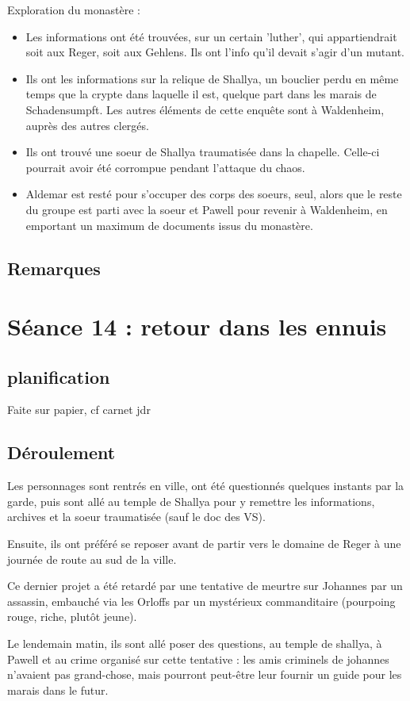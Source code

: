 \documentclass[10pt,a4paper]{book}
\begin{document}
Exploration du monastère :
\begin{itemize}
\item Les informations ont été trouvées, sur un certain 'luther', qui appartiendrait soit aux Reger, soit aux Gehlens. Ils ont l'info qu'il devait s'agir d'un mutant.
\item Ils ont les informations sur la relique de Shallya, un bouclier perdu en même temps que la crypte dans laquelle il est, quelque part dans les marais de Schadensumpft. Les autres éléments de cette enquête sont à Waldenheim, auprès des autres clergés.
\item Ils ont trouvé une soeur de Shallya traumatisée dans la chapelle. Celle-ci pourrait avoir été corrompue pendant l'attaque du chaos.
\item Aldemar est resté pour s'occuper des corps des soeurs, seul, alors que le reste du groupe est parti avec la soeur et Pawell pour revenir à Waldenheim, en emportant un maximum de documents issus du monastère.
\end{itemize}
\subsection{Remarques}
\section{Séance 14 : retour dans les ennuis}
\subsection{planification}
Faite sur papier, cf carnet jdr
\subsection{Déroulement}
Les personnages sont rentrés en ville, ont été questionnés quelques instants par la garde, puis sont allé au temple de Shallya pour y remettre les informations, archives et la soeur traumatisée (sauf le doc des VS). 

Ensuite, ils ont préféré se reposer avant de partir vers le domaine de Reger à une journée de route au sud de la ville. 

Ce dernier projet a été retardé par une tentative de meurtre sur Johannes par un assassin, embauché via les Orloffs par un mystérieux commanditaire (pourpoing rouge, riche, plutôt jeune). 

Le lendemain matin, ils sont allé poser des questions, au temple de shallya, à Pawell et au crime organisé sur cette tentative : les amis criminels de johannes n'avaient pas grand-chose, mais pourront peut-être leur fournir un guide pour les marais dans le futur.
\end{document}
